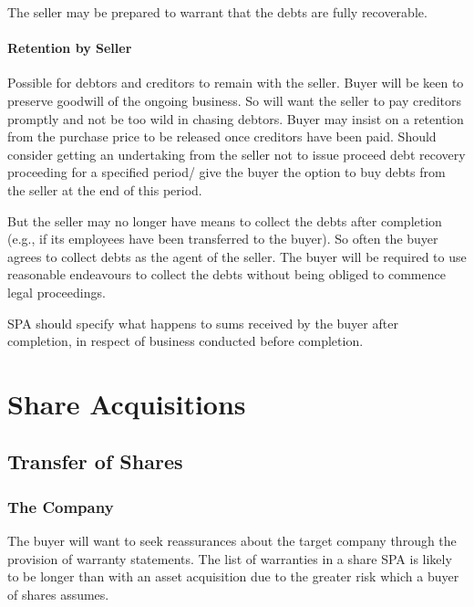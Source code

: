 \documentclass[
]{article}
\begin{document}
The seller may be prepared to warrant that the debts are fully
recoverable.

\hypertarget{retention-by-seller}{%
\paragraph{Retention by Seller}\label{retention-by-seller}}

Possible for debtors and creditors to remain with the seller. Buyer will
be keen to preserve goodwill of the ongoing business. So will want the
seller to pay creditors promptly and not be too wild in chasing debtors.
Buyer may insist on a retention from the purchase price to be released
once creditors have been paid. Should consider getting an undertaking
from the seller not to issue proceed debt recovery proceeding for a
specified period/ give the buyer the option to buy debts from the seller
at the end of this period.

But the seller may no longer have means to collect the debts after
completion (e.g., if its employees have been transferred to the buyer).
So often the buyer agrees to collect debts as the agent of the seller.
The buyer will be required to use reasonable endeavours to collect the
debts without being obliged to commence legal proceedings.

SPA should specify what happens to sums received by the buyer after
completion, in respect of business conducted before completion.

\hypertarget{share-acquisitions}{%
\section{Share Acquisitions}\label{share-acquisitions}}

\hypertarget{transfer-of-shares}{%
\subsection{Transfer of Shares}\label{transfer-of-shares}}

\hypertarget{the-company}{%
\subsubsection{The Company}\label{the-company}}

The buyer will want to seek reassurances about the target company
through the provision of warranty statements. The list of warranties in
a share SPA is likely to be longer than with an asset acquisition due to
the greater risk which a buyer of shares assumes.
\end{document}
